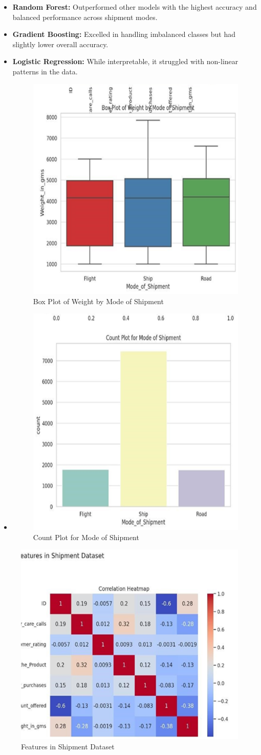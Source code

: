 \documentclass[conference]{IEEEtran}
\begin{document}
\begin{itemize}
    \item \textbf{Random Forest:} Outperformed other models with the highest accuracy and balanced performance across shipment modes.
    \item \textbf{Gradient Boosting:} Excelled in handling imbalanced classes but had slightly lower overall accuracy.
    \item \textbf{Logistic Regression:} While interpretable, it struggled with non-linear patterns in the data.

\begin{figure}
    \centering
    \includegraphics[width=0.5\linewidth]{image2.png}
    \caption{Box Plot of Weight by Mode of Shipment}
    \label{fig:enter-label}
\end{figure}
\item 
\begin{figure}
    \centering
    \includegraphics[width=0.5\linewidth]{image.png}
    \caption{Count Plot for Mode of Shipment}
    \label{fig:enter-label}
\end{figure}
\end{itemize}
\begin{figure}
    \centering
    \includegraphics[width=0.5\linewidth]{image3.png}
    \caption{Features in Shipment Dataset}
    \label{fig:enter-label}
\end{figure}
\end{document}
